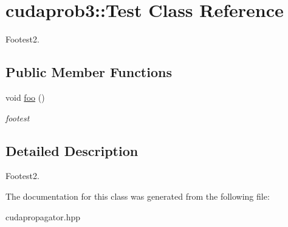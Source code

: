 \hypertarget{structcudaprob3_1_1Test}{}\section{cudaprob3\+:\+:Test Class Reference}
\label{structcudaprob3_1_1Test}


Footest2.  


\subsection*{Public Member Functions}
\begin{DoxyCompactItemize}
\item 
void \hyperlink{structcudaprob3_1_1Test_ab63711999517620fb17e52addc2397ec}{foo} ()\hypertarget{structcudaprob3_1_1Test_ab63711999517620fb17e52addc2397ec}{}\label{structcudaprob3_1_1Test_ab63711999517620fb17e52addc2397ec}

\begin{DoxyCompactList}\small\item\em footest \end{DoxyCompactList}\end{DoxyCompactItemize}


\subsection{Detailed Description}
Footest2. 

The documentation for this class was generated from the following file\+:\begin{DoxyCompactItemize}
\item 
cudapropagator.\+hpp\end{DoxyCompactItemize}
